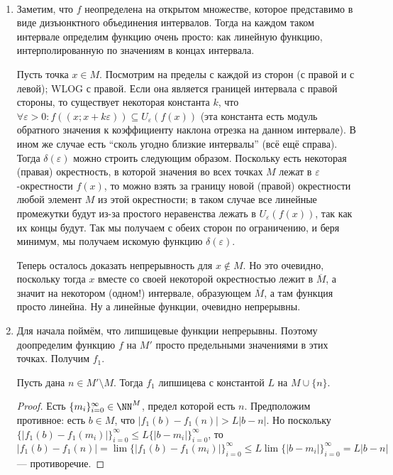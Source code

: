 \documentclass[12pt,a4paper]{article}
\begin{document}
    \begin{enumproblem}[\textcolor{green}{сдано}]\ 
        \ItemedProblem
        \begin{enumerate}
            \item Заметим, что $f$ неопределена на открытом множестве, которое представимо в виде дизъюнктного объединения интервалов. Тогда на каждом таком интервале определим функцию очень просто: как линейную функцию, интерполированную по значениям в концах интервала.
            
            Пусть точка $x \in M$. Посмотрим на пределы с каждой из сторон (с правой и с левой); WLOG с правой. Если она является границей интервала с правой стороны, то существует некоторая константа $k$, что $\forall \varepsilon > 0: f((x; x + k\varepsilon)) \subseteq U_\varepsilon(f(x))$ (эта константа есть модуль обратного значения к коэффициенту наклона отрезка на данном интервале). В ином же случае есть ``сколь угодно близкие интервалы'' (всё ещё справа). Тогда $\delta(\varepsilon)$ можно строить следующим образом. Поскольку есть некоторая (правая) окрестность, в которой значения во всех точках $M$ лежат в $\varepsilon$-окрестности $f(x)$, то можно взять за границу новой (правой) окрестности любой элемент $M$ из этой окрестности; в таком случае все линейные промежутки будут из-за простого неравенства лежать в $U_\varepsilon(f(x))$, так как их концы будут. Так мы получаем с обеих сторон по ограничению, и беря минимум, мы получаем искомую функцию $\delta(\varepsilon)$.

            Теперь осталось доказать непрерывность для $x \notin M$. Но это очевидно, поскольку тогда $x$ вместе со своей некоторой окрестностью лежит в $\overline{M}$, а значит на некотором (одном!) интервале, образующем $\overline{M}$, а там функция просто линейна. Ну а линейные функции, очевидно непрерывны.
            
            \item Для начала поймём, что липшицевые функции непрерывны. Поэтому доопределим функцию $f$ на $M'$ просто предельными значениями в этих точках. Получим $f_1$.
            
            \begin{lemma}
                Пусть дана $n \in M' \setminus M$. Тогда $f_1$ липшицева с константой $L$ на $M\cup\{n\}$.
            \end{lemma}

            \begin{proof}
                Есть $\{m_i\}_{i=0}^\infty \in \NN^M$, предел которой есть $n$. Предположим противное: есть $b \in M$, что $|f_1(b) - f_1(n)| > L |b-n|$. Но поскольку $\{|f_1(b)-f_1(m_i)|\}_{i=0}^\infty \leqslant L\{|b-m_i|\}_{i=0}^\infty$, то $|f_1(b) - f_1(n)| = \lim \{|f_1(b)-f_1(m_i)|\}_{i=0}^\infty \leqslant L\lim \{|b-m_i|\}_{i=0}^\infty = L |b-n|$ --- противоречие.
            \end{proof}


\end{enumerate}
\end{enumproblem}
\end{document}
